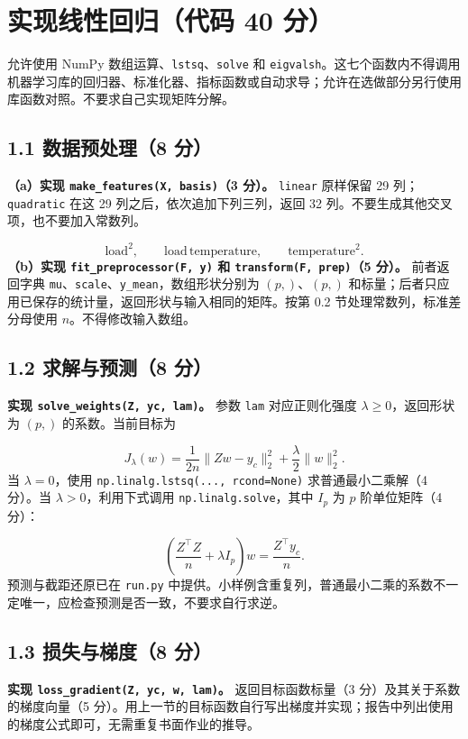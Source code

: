 \documentclass[11pt,a4paper]{article}
\newcommand{\code}[1]{{\small\nolinkurl{#1}}}
\begin{document}
\section{实现线性回归（代码 40 分）}
允许使用 NumPy 数组运算、\code{lstsq}、\code{solve} 和 \code{eigvalsh}。这七个函数内不得调用机器学习库的回归器、标准化器、指标函数或自动求导；允许在选做部分另行使用库函数对照。不要求自己实现矩阵分解。


\subsection*{1.1 数据预处理（8 分）}


\textbf{（a）实现 {\small\texttt{make\_features(X, basis)}}（3 分）。} \code{linear} 原样保留 29 列；\code{quadratic} 在这 29 列之后，依次追加下列三列，返回 32 列。不要生成其他交叉项，也不要加入常数列。


\[
\mathrm{load}^2,\qquad
\mathrm{load}\,\mathrm{temperature},\qquad
\mathrm{temperature}^2.
\]
\textbf{（b）实现 {\small\texttt{fit\_preprocessor(F, y)}} 和 {\small\texttt{transform(F, prep)}}（5 分）。} 前者返回字典 \code{mu}、\code{scale}、\code{y_mean}，数组形状分别为 $(p,)$、$(p,)$ 和标量；后者只应用已保存的统计量，返回形状与输入相同的矩阵。按第 0.2 节处理常数列，标准差分母使用 $n$。不得修改输入数组。


\subsection*{1.2 求解与预测（8 分）}
\textbf{实现 {\small\texttt{solve\_weights(Z, yc, lam)}}。} 参数 \code{lam} 对应正则化强度 $\lambda\geq0$，返回形状为 $(p,)$ 的系数。当前目标为


\[
J_\lambda(w)=\frac1{2n}\|Zw-y_c\|_2^2+
\frac\lambda2\|w\|_2^2.
\]
当 $\lambda=0$，使用 {\small\texttt{np.linalg.lstsq(..., rcond=None)}} 求普通最小二乘解（4 分）。当 $\lambda>0$，利用下式调用 \code{np.linalg.solve}，其中 $I_p$ 为 $p$ 阶单位矩阵（4 分）：


\[
\left(\frac{Z^\top Z}{n}+\lambda I_p\right)w
=\frac{Z^\top y_c}{n}.
\]
预测与截距还原已在 \code{run.py} 中提供。小样例含重复列，普通最小二乘的系数不一定唯一，应检查预测是否一致，不要求自行求逆。


\subsection*{1.3 损失与梯度（8 分）}
\textbf{实现 {\small\texttt{loss\_gradient(Z, yc, w, lam)}}。} 返回目标函数标量（3 分）及其关于系数的梯度向量（5 分）。用上一节的目标函数自行写出梯度并实现；报告中列出使用的梯度公式即可，无需重复书面作业的推导。
\end{document}
